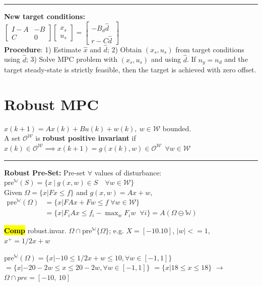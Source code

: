 \documentclass[10pt,a4paper,landscape]{article}
\newcommand{\hlc}[2][yellow]{ {\sethlcolor{#1} \hl{#2}} }
\newcommand{\quadRule}{\vspace{-3pt}\rule{0.23\textwidth}{0.4pt}}
\newcommand{\comp}{\footnotesize{\hlc[cyan]{\textbf{Comp}}}} %
\begin{document}
\begin{multicols*}{4}
\quadRule

\textbf{New target conditions:} \\
$\begin{bmatrix} 
	I-A & -B \\ C & 0 \end{bmatrix} 
\begin{bmatrix} x_s \\ u_s \end{bmatrix} = 
\begin{bmatrix} -B_d \hat{d} \\ r - C \hat{d}\end{bmatrix}$\\
\textbf{Procedure}: 1) Estimate $\hat{x}$ and $\hat{d}$; 2) Obtain $(x_s, u_s)$ from target conditions using $\hat{d}$; 3) Solve MPC problem with $(x_s, u_s)$ and using $\hat{d}$.
If $n_y = n_d$ and the target steady-state is strictly feasible, then the target is achieved with zero offset.

\section{Robust MPC}
$x(k+1) = Ax(k) + Bu(k) + w(k),\ w \in \mathcal{W}$ bounded.\\
A set $\mathcal{O}^\mathcal{W}$ is \textbf{robust positive invariant} if $x(k) \in \mathcal{O}^\mathcal{W} \implies x(k+1) = g(x(k),w) \in \mathcal{O}^\mathcal{W} \:\: \forall w \in \mathcal{W}$

\quadRule

\textbf{Robust Pre-Set:} Pre-set $\forall$ values of disturbance: $\mathrm{pre}^\mathbb{W}(S)= \{ x \:|\: g(x,w) \in S \quad \forall w \in \mathcal{W} \}$\\
Given $\Omega = \{ x | Fx\leq f \}$ and $g(x,w) = Ax + w$, $
\begin{aligned}
	\mathrm{pre}^\mathbb{W}(\Omega) &= \{ x | FAx + Fw \leq f \; \forall w \in \mathcal{W}\}\\
	& = \{ x | F_i Ax \leq f_i - \max_w F_i w \;\; \forall i \} = A(\Omega \ominus \mathbb{W})
\end{aligned}$

\comp robust.invar. $\Omega \cap \mathrm{pre}^\mathbb{W} \{\Omega\}$; e.g. $X = [-10.10]$, $|w|<=1$, $x^+=1/2 x + w$

$\mathrm{pre}^\mathbb{W}(\Omega) = \{x | -10 \leq 1/2 x + w \leq 10, \forall w \in [-1,1]\}$
$=\{x | -20 -2w \leq x \leq 20 -2w, \forall w \in [-1,1]\}$
$ = \{x | 18\leq x \leq 18\}$ $\rightarrow$ $\Omega \cap pre = [-10, \ 10] $


\end{multicols*}
\end{document}
